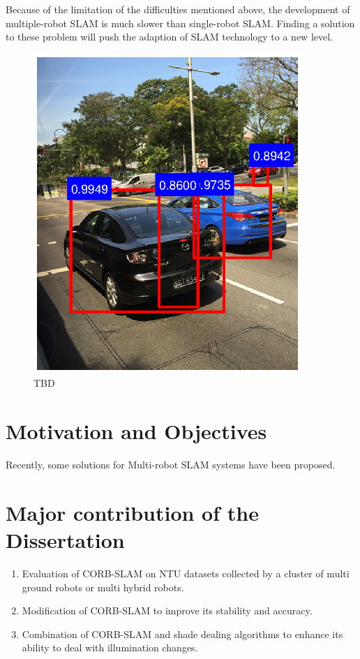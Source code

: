 Because of the limitation of the difficulties mentioned above, the development of multiple-robot SLAM is much slower than single-robot SLAM. Finding a solution to these problem will push the adaption of SLAM technology to a new level.

\begin{figure}[H]
\centering
\includegraphics[width=4in]{Chapter1/boundingbox.eps}
\caption{TBD}
\label{fig:boundingboxexample} 
\end{figure}


\section{Motivation and Objectives}

Recently, some solutions for Multi-robot SLAM systems have been proposed.\cite{mcmanus2014shady}




\section{Major contribution of the Dissertation}
\begin{enumerate}[1.]
	\item Evaluation of CORB-SLAM on NTU datasets collected by a cluster of multi ground robots or multi hybrid robots.
	\item Modification of CORB-SLAM to improve its stability and accuracy.
	\item Combination of CORB-SLAM and shade dealing algorithms to enhance its ability to deal with illumination changes.
\end{enumerate}


